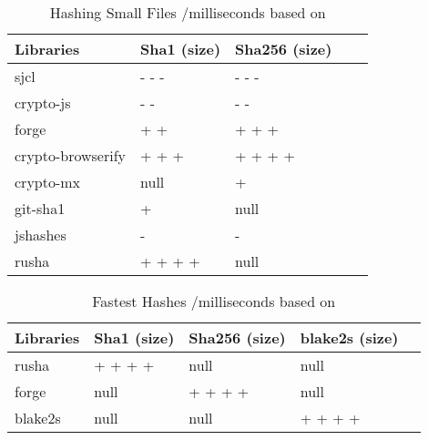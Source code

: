 \begin{table}[!ht]
\centering
\caption{Hashing Small Files /milliseconds based on \cite {Tarr2014PerformanceLibraries.}}
\label{tab:hashing-small-files}
\begin{adjustbox}{center, width=\columnwidth-20pt}
\begin{tabular}{|l|l|l|l|l|}
\hline
Libraries & Sha1 (size) & Sha256 (size) \\ \hline
sjcl				& - - -	& - - -		\\ \hline
crypto-js			& - -	& - -		\\ \hline
forge				& + +	& + + +		\\ \hline
crypto-browserify	& + + +	& + + + +	\\ \hline
crypto-mx           & null	& +			\\ \hline
git-sha1            & +		& null		\\ \hline
jshashes            & -		& -			\\ \hline
rusha               & + + + +	& null	\\ \hline
\end{tabular}
\end{adjustbox}
\end{table}

\begin{table}[!ht]
\centering
\caption{Fastest Hashes /milliseconds based on \cite {Tarr2014PerformanceLibraries.}}
\label{tab:fastest-hashes}
\begin{adjustbox}{center, width=\columnwidth-20pt}
\begin{tabular}{|l|l|l|l|l|}
\hline
Libraries & Sha1 (size) & Sha256 (size) & blake2s (size) \\ \hline
rusha	& + + + +	& null		& null		\\ \hline
forge	& null		& + + + +	& null		\\ \hline
blake2s	& null		& null		& + + + +	\\ \hline
\end{tabular}
\end{adjustbox}
\end{table}


